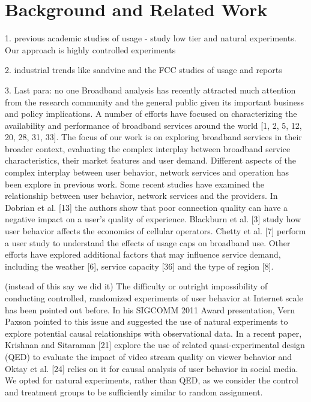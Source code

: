 \section{Background and Related Work}\label{sec:related}

1. previous academic studies of usage - study low tier and natural experiments. Our approach is highly controlled experiments

2. industrial trends like sandvine and the FCC studies of usage and reports
\cite{fcc2015broadband-report}

3. Last para: no one 
Broadband analysis has recently attracted much attention
from the research community and the general public given
its important business and policy implications. A number
of efforts have focused on characterizing the availability and
performance of broadband services around the world [1, 2,
5, 12, 20, 28, 31, 33]. The focus of our work is on exploring
broadband services in their broader context, evaluating the
complex interplay between broadband service characteristics,
their market features and user demand.
Different aspects of the complex interplay between user
behavior, network services and operation has been explore
in previous work. Some recent studies have examined the
relationship between user behavior, network services and
the providers. In Dobrian et al. [13] the authors show that
poor connection quality can have a negative impact on a
user’s quality of experience. Blackburn et al. [3] study how
user behavior affects the economics of cellular operators.
Chetty et al. [7] perform a user study to understand the
effects of usage caps on broadband use. Other efforts
have explored additional factors that may influence service
demand, including the weather [6], service capacity [36] and
the type of region [8].



(instead of this say we did it)
The difficulty or outright impossibility of conducting controlled,
randomized experiments of user behavior at Internet
scale has been pointed out before. In his SIGCOMM 2011
Award presentation, Vern Paxson pointed to this issue
and suggested the use of natural experiments to explore
potential causal relationships with observational data. In
a recent paper, Krishnan and Sitaraman [21] explore the
use of related quasi-experimental design (QED) to evaluate
the impact of video stream quality on viewer behavior and
Oktay et al. [24] relies on it for causal analysis of user
behavior in social media. We opted for natural experiments,
rather than QED, as we consider the control and treatment
groups to be sufficiently similar to random assignment.